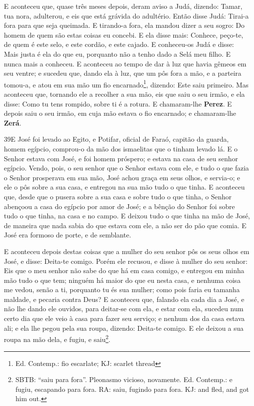 E aconteceu que, quase três meses depois, deram aviso a Judá,
dizendo: Tamar, tua nora, adulterou, e eis que está grávida do
adultério. Então disse Judá: Tirai-a fora para que seja queimada.
E tirando-a fora, ela mandou dizer a seu sogro: Do homem de
quem são estas coisas eu concebi. E ela disse mais: Conhece,
peço-te, de quem é este selo, e este cordão, e este cajado. E
conheceu-os Judá e disse: Mais justa é ela do que eu, porquanto não
a tenho dado a Selá meu filho. E nunca mais a conheceu. E
aconteceu ao tempo de dar à luz que havia gêmeos em seu ventre;
e sucedeu que, dando ela à luz, que um pôs fora a mão, e a
parteira tomou-a, e atou em sua mão um fio encarnado\footnote{Ed.
Contemp.: fio escarlate; KJ: scarlet thread}, dizendo: Este saiu
primeiro. Mas aconteceu que, tornando ele a recolher a sua
mão, eis que saiu o seu irmão, e ela disse: Como tu tens rompido,
sobre ti é a rotura. E chamaram-lhe \textbf{Perez}. E depois
saiu o seu irmão, em cuja mão estava o fio encarnado; e chamaram-lhe
\textbf{Zerá}.

\smallskip

\lettrine{39} E José foi levado ao Egito, e Potifar, oficial
de Faraó, capitão da guarda, homem egípcio, comprou-o da mão dos
ismaelitas que o tinham levado lá. E o Senhor estava com José, e
foi homem próspero; e estava na casa de seu senhor egípcio.
Vendo, pois, o seu senhor que o Senhor estava com ele, e tudo o
que fazia o Senhor prosperava em sua mão, José achou graça em
seus olhos, e servia-o; e ele o pôs sobre a sua casa, e entregou na
sua mão tudo o que tinha. E aconteceu que, desde que o pusera
sobre a sua casa e sobre tudo o que tinha, o Senhor abençoou a casa
do egípcio por amor de José; e a bênção do Senhor foi sobre tudo o
que tinha, na casa e no campo. E deixou tudo o que tinha na mão
de José, de maneira que nada sabia do que estava com ele, a não ser
do pão que comia. E José era formoso de porte, e de semblante.

E aconteceu depois destas coisas que a mulher do seu senhor pôs os
seus olhos em José, e disse: Deita-te comigo. Porém ele recusou,
e disse à mulher do seu senhor: Eis que o meu senhor não sabe do que
há em casa comigo, e entregou em minha mão tudo o que tem;
ninguém há maior do que eu nesta casa, e nenhuma coisa me vedou,
senão a ti, porquanto tu és sua mulher; como pois faria eu tamanha
maldade, e pecaria contra Deus? E aconteceu que, falando ela
cada dia a José, e não lhe dando ele ouvidos, para deitar-se com
ela, e estar com ela, sucedeu num certo dia que ele veio à
casa para fazer seu serviço; e nenhum dos da casa estava ali;
e ela lhe pegou pela sua roupa, dizendo: Deita-te comigo. E
ele deixou a sua roupa na mão dela, e fugiu, e saiu\footnote{SBTB:
``saiu para fora''. Pleonasmo vicioso, novamente. Ed. Contemp.: e
fugiu, escapando para fora. RA: saiu, fugindo para fora. KJ: and
fled, and got him out.}.

